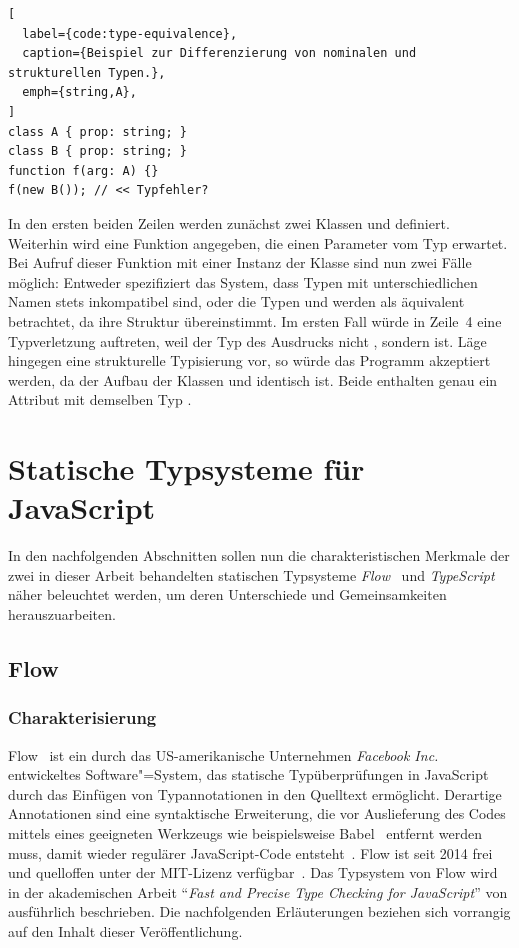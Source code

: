 \begin{lstlisting}[
  label={code:type-equivalence},
  caption={Beispiel zur Differenzierung von nominalen und strukturellen Typen.},
  emph={string,A},
]
class A { prop: string; }
class B { prop: string; }
function f(arg: A) {}
f(new B()); // << Typfehler?
\end{lstlisting}

In den ersten beiden Zeilen werden zunächst zwei Klassen  und  definiert. Weiterhin wird eine Funktion  angegeben, die einen Parameter vom Typ  erwartet. Bei Aufruf dieser Funktion mit einer Instanz der Klasse  sind nun zwei Fälle möglich: Entweder spezifiziert das System, dass Typen mit unterschiedlichen Namen stets inkompatibel sind, oder die Typen  und  werden als äquivalent betrachtet, da ihre Struktur übereinstimmt. Im ersten Fall würde in Zeile~4 eine Typverletzung auftreten, weil der Typ des Ausdrucks  nicht , sondern  ist. Läge hingegen eine strukturelle Typisierung vor, so würde das Programm akzeptiert werden, da der Aufbau der Klassen  und  identisch ist. Beide enthalten genau ein Attribut  mit demselben Typ .

\section{Statische Typsysteme für JavaScript}
\label{sec:static-typesystems-for-js}

In den nachfolgenden Abschnitten sollen nun die charakteristischen Merkmale der zwei in dieser Arbeit behandelten statischen Typsysteme \textit{Flow}~\autocite{FLOW:PAPER} und \textit{TypeScript}~\autocite{TYPESCRIPT:SPEC} näher beleuchtet werden, um deren Unterschiede und Gemeinsamkeiten herauszuarbeiten.

\subsection{Flow}
\label{sec:flow}

\subsubsection{Charakterisierung}

Flow~\autocite{FLOW:PAPER} ist ein durch das US-amerikanische Unternehmen \textit{Facebook Inc.} entwickeltes Software"=System, das statische Typüberprüfungen in JavaScript durch das Einfügen von Typannotationen in den Quelltext ermöglicht. Derartige Annotationen sind eine syntaktische Erweiterung, die vor Auslieferung des Codes mittels eines geeigneten Werkzeugs wie beispielsweise Babel~\autocite{BABEL} entfernt werden muss, damit wieder regulärer JavaScript-Code entsteht~\autocite{FLOW:INSTALLATION}. Flow ist seit 2014 frei und quelloffen unter der MIT-Lizenz verfügbar~\autocites{LICENSE:MIT,FLOW:GITHUB}. Das Typsystem von Flow wird in der akademischen Arbeit \enquote{\textit{Fast and Precise Type Checking for JavaScript}} von \citeauthor{FLOW:PAPER} ausführlich beschrieben. Die nachfolgenden Erläuterungen beziehen sich vorrangig auf den Inhalt dieser Veröffentlichung.


